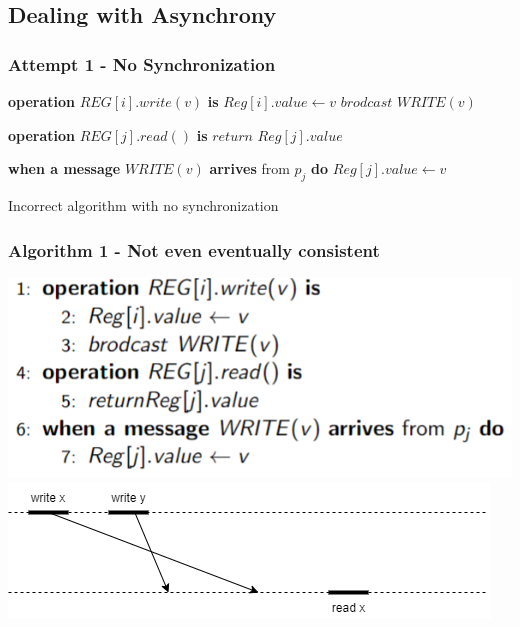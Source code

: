 \subsection{Dealing with Asynchrony}

\begin{frame}[fragile]
    \frametitle{Attempt 1 - No Synchronization}
    \begin{algorithm}[H]
        \begin{algorithmic}[0]
            \STATE \textbf{operation} $REG[i].write(v)$ \textbf{is}
            \bindent
                \STATE $Reg[i].value \leftarrow v$
                \STATE $brodcast$ $WRITE(v)$
            \eindent

            \STATE \textbf{operation} $REG[j].read()$ \textbf{is}
            \bindent
                \STATE $return$ $Reg[j].value$
            \eindent
            
            \STATE \textbf{when a message} $WRITE(v)$ \textbf{arrives} from $p_j$ \textbf{do}
            \bindent
                \STATE $Reg[j].value \leftarrow v$
            \eindent

        \end{algorithmic}
        \caption{Incorrect algorithm with no synchronization}
        \label{alg:seq}
    \end{algorithm}
\end{frame}

\begin{frame}
    \frametitle{Algorithm 1 - Not even eventually consistent}
    \begin{center}
        \includegraphics[scale=.7]{resources/alg1_src.png}
        \includegraphics[scale=.5]{resources/alg1_incorrectness.png}
    \end{center}
\end{frame}

